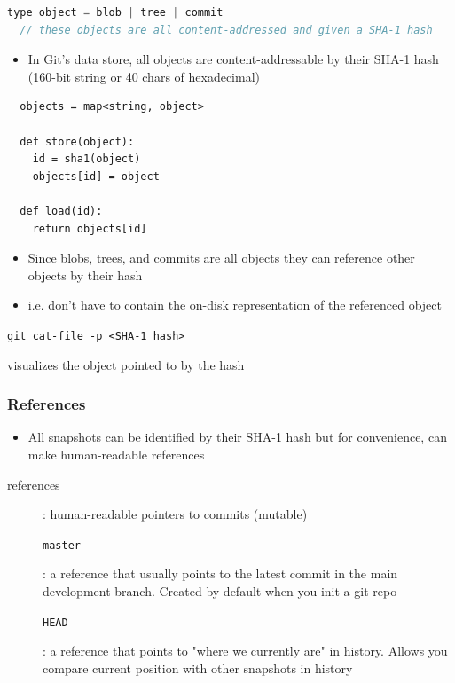 \documentclass[letterpaper,12pt]{article}
\newcommand*{\lstitem}[1]{
  \setbox0\hbox{\lstinline{#1}}
  \item[\usebox0]
}
\begin{document}
\begin{lstlisting}[language=c++]
  type object = blob | tree | commit
  // these objects are all content-addressed and given a SHA-1 hash
\end{lstlisting}

\begin{itemize}
 \item In Git's data store, all objects are content-addressable by their SHA-1 hash (160-bit string or 40 chars of hexadecimal)
\end{itemize}

\begin{lstlisting}
  objects = map<string, object>

  def store(object):
    id = sha1(object)
    objects[id] = object

  def load(id):
    return objects[id]
\end{lstlisting}

\begin{itemize}
 \item Since blobs, trees, and commits are all objects they can reference other objects by their hash
 \item i.e. don't have to contain the on-disk representation of the referenced object
\end{itemize}

\begin{description}
 \lstitem{git cat-file -p <SHA-1 hash>} visualizes the object pointed to by the hash
\end{description}

\subsubsection{References}
\begin{itemize}
 \item All snapshots can be identified by their SHA-1 hash but for convenience, can make human-readable references
\end{itemize}

\begin{description}
 \item[references]: human-readable pointers to commits (mutable)
       \lstitem{master}: a reference that usually points to the latest commit in the main development branch. Created by default when you init a git repo
       \lstitem{HEAD}: a reference that points to "where we currently are" in history. Allows you compare current position with other snapshots in history
\end{description}
\end{document}
